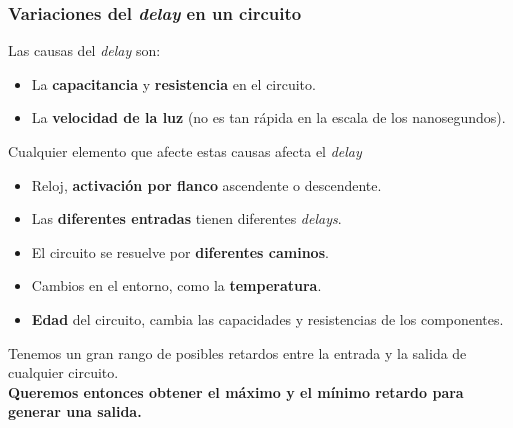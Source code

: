\documentclass[aspectratio=169]{beamer}
\begin{document}
\begin{frame}[fragile]
    \frametitle{Variaciones del \emph{delay} en un circuito}
    \small
    \textcolor{naranjauca}{Las causas del \emph{delay} son:}\\
    \begin{itemize}
    \item La \textbf{capacitancia} y \textbf{resistencia} en el circuito.
    \item La \textbf{velocidad de la luz} \textcolor{verdeuca}{(no es tan rápida en la escala de los nanosegundos)}.
    \end{itemize}
    \pause
    \textcolor{naranjauca}{Cualquier elemento que afecte estas causas afecta el \emph{delay}}\\
    \begin{itemize}
    \setlength\itemsep{0.0cm}
    \item Reloj, \textbf{activación por flanco} ascendente o descendente.
    \item Las \textbf{diferentes entradas} tienen diferentes \emph{delays}.
    \item El circuito se resuelve por \textbf{diferentes caminos}.
    \item Cambios en el entorno, como la \textbf{temperatura}. %
    \item \textbf{Edad} del circuito, cambia las capacidades y resistencias de los componentes.
    \end{itemize}
    \pause
    \begin{center}
    \textcolor{verdeuca}{Tenemos un gran rango de posibles retardos entre la entrada y la salida de cualquier circuito.}\\
    \textcolor{verdeuca}{\textbf{Queremos entonces obtener el máximo y el mínimo retardo para generar una salida.}}
    \end{center}
\end{frame}
\end{document}
